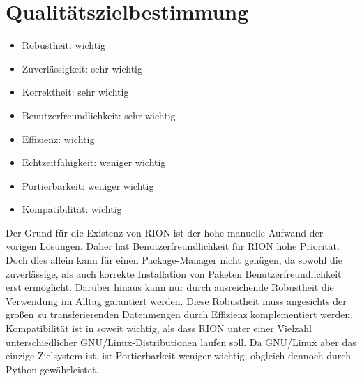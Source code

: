 \chapter{Qualitätszielbestimmung}

\begin{itemize}
	\item Robustheit: wichtig
	\item Zuverlässigkeit: sehr wichtig
	\item Korrektheit: sehr wichtig
	\item Benutzerfreundlichkeit: sehr wichtig
	\item Effizienz: wichtig
	\item Echtzeitfähigkeit: weniger wichtig
	\item Portierbarkeit: weniger wichtig
	\item Kompatibilität: wichtig
\end{itemize}

Der Grund für die Existenz von RION ist der hohe manuelle Aufwand der vorigen Lösungen.
Daher hat Benutzerfreundlichkeit für RION hohe Priorität.
Doch dies allein kann für einen Package-Manager nicht genügen, da sowohl die zuverlässige, als auch korrekte Installation von Paketen Benutzerfreundlichkeit erst ermöglicht. Darüber hinaus kann nur durch ausreichende Robustheit die Verwendung im Alltag garantiert werden. Diese Robustheit muss angesichts der großen zu transferierenden Datenmengen durch Effizienz komplementiert werden.
Kompatibilität ist in soweit wichtig, als dass RION unter einer Vielzahl unterschiedlicher GNU/Linux-Distributionen laufen soll. Da GNU/Linux aber das einzige Zielsystem ist, ist Portierbarkeit weniger wichtig, obgleich dennoch durch Python gewährleistet.
